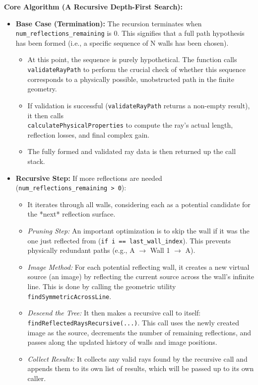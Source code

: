 \documentclass{article}
\begin{document}
	\textbf{Core Algorithm (A Recursive Depth-First Search):}
	\begin{itemize}
		\item \textbf{Base Case (Termination):} The recursion terminates when \texttt{num\_reflections\_remaining} is 0. This signifies that a full path hypothesis has been formed (i.e., a specific sequence of N walls has been chosen).
		\begin{itemize}
			\item At this point, the sequence is purely hypothetical. The function calls \texttt{validateRayPath} to perform the crucial check of whether this sequence corresponds to a physically possible, unobstructed path in the finite geometry.
			\item If validation is successful (\texttt{validateRayPath} returns a non-empty result), it then calls\\
			\texttt{calculatePhysicalProperties} to compute the ray's actual length, reflection losses, and final complex gain.
			\item The fully formed and validated ray data is then returned up the call stack.
		\end{itemize}
		\item \textbf{Recursive Step:} If more reflections are needed (\texttt{num\_reflections\_remaining > 0}):
		\begin{itemize}
			\item It iterates through all walls, considering each as a potential candidate for the *next* reflection surface.
			\item \textit{Pruning Step:} An important optimization is to skip the wall if it was the one just reflected from (\texttt{if i == last\_wall\_index}). This prevents physically redundant paths (e.g., A $\rightarrow$ Wall 1 $\rightarrow$ A).
			\item \textit{Image Method:} For each potential reflecting wall, it creates a new virtual source (an image) by reflecting the current source across the wall's infinite line. This is done by calling the geometric utility \texttt{findSymmetricAcrossLine}.
			\item \textit{Descend the Tree:} It then makes a recursive call to itself: \texttt{findReflectedRaysRecursive(...)}. This call uses the newly created image as the source, decrements the number of remaining reflections, and passes along the updated history of walls and image positions.
			\item \textit{Collect Results:} It collects any valid rays found by the recursive call and appends them to its own list of results, which will be passed up to its own caller.
		\end{itemize}
	\end{itemize}
	
\end{document}
